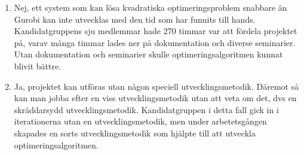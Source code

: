 \begin{enumerate}
\item Nej, ett system som kan lösa kvadratiska optimeringsproblem snabbare än Gurobi kan inte utvecklas med den tid som har funnits till hands. Kandidatgruppens sju medlemmar hade 270 timmar var att fördela projektet på, varav många timmar lades ner på dokumentation och diverse seminarier. Utan dokumentation och seminarier skulle optimeringsalgoritmen kunnat blivit bättre.

\item Ja, projektet kan utföras utan någon speciell utvecklingsmetodik. Däremot så kan man jobba efter en viss utvecklingsmetodik utan att veta om det, dvs en skräddarsydd utvecklingsmetodik. Kandidatgruppen i detta fall gick in i iterationerna utan en utvecklingsmetodik, men under arbetetsgången skapades en sorts utvecklingsmetodik som hjälpte till att utveckla optimeringsalgoritmen.
\end{enumerate}
	
	
